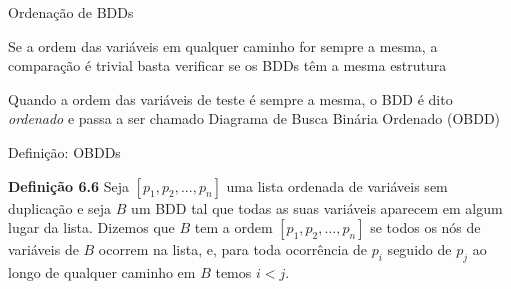 \expandafter\documentclass\expandafter[table, usenames, svgnames, dvipsnames,14pt, \classopts]{beamer}
\begin{document}
\begin{frame}{Ordenação de \uppercase{BDD}s}

    \begin{outline}
        \1 Se a ordem das variáveis em qualquer caminho for sempre a mesma, a comparação é trivial
            \2[-] basta verificar se os BDDs têm a mesma estrutura

        \vspace{1em}
            
        \1 Quando a ordem das variáveis de teste é sempre a mesma, o BDD é dito \textit{ordenado}
            \2[-] e passa a ser chamado Diagrama de Busca Binária Ordenado (OBDD)
    \end{outline}

\end{frame}

\begin{frame}{Definição: \uppercase{OBDD}s}

    \begin{block}{\textbf{Definição 6.6}}
        Seja $[p_1,p_2,...,p_n]$ uma lista ordenada de variáveis sem duplicação e seja $B$ um BDD tal que todas as suas variáveis aparecem em algum lugar da lista. Dizemos que $B$ tem a ordem $[p_1,p_2,...,p_n]$ se todos os nós de variáveis de $B$ ocorrem na lista, e, para toda ocorrência de $p_i$ seguido de $p_j$ ao longo de qualquer caminho em $B$ temos $i < j$.
    \end{block}

\end{frame}
\end{document}
